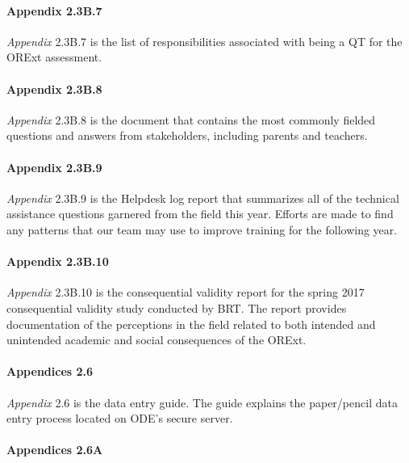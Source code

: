 \documentclass[]{article}
\let\oldparagraph\paragraph
\renewcommand{\paragraph}[1]{\oldparagraph{#1}\mbox{}}
\begin{document}
\paragraph{Appendix 2.3B.7}\label{appendix-2.3b.7}

\emph{Appendix} 2.3B.7 is the list of responsibilities associated with
being a QT for the ORExt assessment.

\paragraph{Appendix 2.3B.8}\label{appendix-2.3b.8}

\emph{Appendix} 2.3B.8 is the document that contains the most commonly
fielded questions and answers from stakeholders, including parents and
teachers.

\paragraph{Appendix 2.3B.9}\label{appendix-2.3b.9}

\emph{Appendix} 2.3B.9 is the Helpdesk log report that summarizes all of
the technical assistance questions garnered from the field this year.
Efforts are made to find any patterns that our team may use to improve
training for the following year.

\paragraph{Appendix 2.3B.10}\label{appendix-2.3b.10}

\emph{Appendix} 2.3B.10 is the consequential validity report for the
spring 2017 consequential validity study conducted by BRT. The report
provides documentation of the perceptions in the field related to both
intended and unintended academic and social consequences of the ORExt.

\paragraph{Appendices 2.6}\label{appendices-2.6}

\emph{Appendix} 2.6 is the data entry guide. The guide explains the
paper/pencil data entry process located on ODE's secure server.

\paragraph{Appendices 2.6A}\label{appendices-2.6a}
\end{document}
